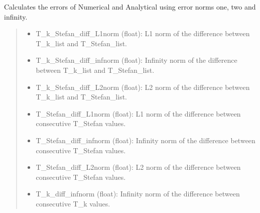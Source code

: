 \documentclass[a4paper,11pt,english,openany]{sphinxmanual}
\begin{document}
\begin{fulllineitems}

\begin{fulllineitems}
\label{\detokenize{api/spyice.postprocess.analysis:spyice.postprocess.analysis.Analysis.error_analytical_numerical}}
\pysigstartsignatures
{}
\pysigstopsignatures
\sphinxAtStartPar
Calculates the errors of Numerical and Analytical using error norms one, two and infinity.
\begin{quote}\begin{description}
\sphinxAtStartPar
{}

\sphinxAtStartPar
\begin{description}
\begin{itemize}
\item {} 
\sphinxAtStartPar
T\_k\_Stefan\_diff\_L1norm (float): L1 norm of the difference between T\_k\_list and T\_Stefan\_list.

\item {} 
\sphinxAtStartPar
T\_k\_Stefan\_diff\_infnorm (float): Infinity norm of the difference between T\_k\_list and T\_Stefan\_list.

\item {} 
\sphinxAtStartPar
T\_k\_Stefan\_diff\_L2norm (float): L2 norm of the difference between T\_k\_list and T\_Stefan\_list.

\item {} 
\sphinxAtStartPar
T\_Stefan\_diff\_L1norm (float): L1 norm of the difference between consecutive T\_Stefan values.

\item {} 
\sphinxAtStartPar
T\_Stefan\_diff\_infnorm (float): Infinity norm of the difference between consecutive T\_Stefan values.

\item {} 
\sphinxAtStartPar
T\_Stefan\_diff\_L2norm (float): L2 norm of the difference between consecutive T\_Stefan values.

\item {} 
\sphinxAtStartPar
T\_k\_diff\_infnorm (float): Infinity norm of the difference between consecutive T\_k values.


\end{itemize}
\end{description}
\end{description}
\end{quote}
\end{fulllineitems}
\end{fulllineitems}
\end{document}
